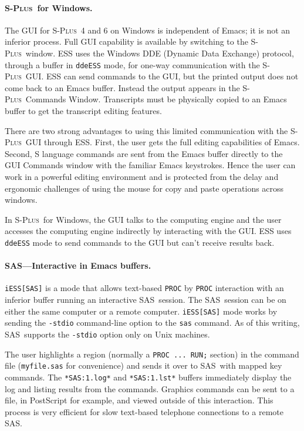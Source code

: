 \documentclass{article}
\newcommand*{\SAS}{\textsc{SAS}}
\newcommand*{\Splus}{\textsc{S-Plus}}
\newcommand{\stexttt}[1]{{\small\texttt{#1}}}
\begin{document}
\paragraph{\Splus\ for Windows.}
The GUI for \Splus\ 4 and 6 on Windows is independent of Emacs; it is not
an inferior process.  Full GUI
capability is available by switching to the \Splus\ window.
ESS uses the Windows DDE (Dynamic Data Exchange) protocol,
through a buffer in \stexttt{ddeESS} mode, for one-way communication with
the \Splus\ GUI.
ESS can send commands to the GUI, but the printed
output does not come back to an Emacs buffer.  Instead the output appears in
the \Splus\ Commands Window.  Transcripts must be physically copied to
an Emacs buffer to get the transcript editing features.

There are two strong advantages to using this limited communication
with the \Splus\ GUI through ESS.  First, the user gets the full
editing capabilities of Emacs.  Second, S language commands are sent
from the Emacs buffer directly to the GUI Commands window with the
familiar Emacs keystrokes.  Hence the user can work in a powerful
editing environment and is protected from the delay and ergonomic
challenges of using the mouse for copy and paste operations across
windows.

In \Splus\ for Windows, the GUI
talks to the computing engine and the user accesses the computing
engine indirectly by interacting with the GUI.  ESS uses
\stexttt{ddeESS} mode to send commands to the GUI but can't receive
results back.

\paragraph{\SAS---Interactive in Emacs buffers.}

\stexttt{iESS[SAS]} is a mode that allows text-based \stexttt{PROC} by
\stexttt{PROC} interaction with an inferior buffer running an
interactive \SAS\ session.  The \SAS\ session can be on either the
same computer or a remote computer.  \stexttt{iESS[SAS]} mode works by
sending the \stexttt{-stdio} command-line option to the \stexttt{sas}
command.  As of this writing, \SAS\ supports the \stexttt{-stdio} option
only on Unix machines.

The user highlights a region (normally a \stexttt{PROC ... RUN;}
section) in the command file (\stexttt{myfile.sas} for convenience)
and sends it over to \SAS\ with mapped key commands.  The
\stexttt{*SAS:1.log*} and \stexttt{*SAS:1.lst*} buffers immediately
display the log and listing results from the commands.
Graphics commands can be sent to a file, in PostScript for example,
and viewed outside of this interaction.  This process is very efficient
for slow text-based telephone connections to a remote \SAS.
\end{document}
